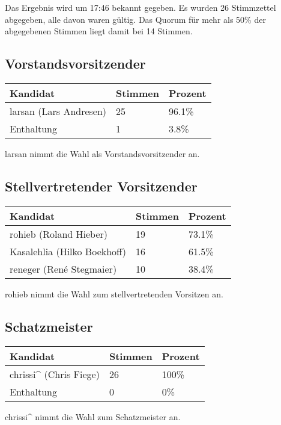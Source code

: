 \documentclass[a4paper,12pt]{scrartcl}
\begin{document}
Das Ergebnis wird um 17:46 bekannt gegeben. Es wurden 26 Stimmzettel abgegeben,
alle davon waren gültig. Das Quorum für mehr als 50\% der abgegebenen Stimmen
liegt damit bei 14 Stimmen.

\subsection*{Vorstandsvorsitzender}
\begin{tabular}{|l|l|l|}
  \hline
  \textbf{Kandidat} & \textbf{Stimmen} & \textbf{Prozent} \\ \hline
  larsan (Lars Andresen) & 25 & 96.1\% \\
  Enthaltung             &  1 &  3.8\% \\
  \hline
\end{tabular}

larsan nimmt die Wahl als Vorstandsvorsitzender an.

\subsection*{Stellvertretender Vorsitzender}
\begin{tabular}{|l|l|l|}
  \hline
  \textbf{Kandidat} & \textbf{Stimmen} & \textbf{Prozent} \\ \hline
  rohieb     (Roland Hieber)  & 19 & 73.1\% \\
  Kasalehlia (Hilko Boekhoff) & 16 & 61.5\% \\
  reneger    (René Stegmaier) & 10 & 38.4\% \\
  \hline
\end{tabular}

rohieb nimmt die Wahl zum stellvertretenden Vorsitzen an.

\subsection*{Schatzmeister}
\begin{tabular}{|l|l|l|}
  \hline
  \textbf{Kandidat} & \textbf{Stimmen} & \textbf{Prozent} \\ \hline
  chrissi\textasciicircum{} (Chris Fiege) & 26 & 100\% \\
  Enthaltung & 0 & 0\% \\
  \hline
\end{tabular}

chrissi\textasciicircum{} nimmt die Wahl zum Schatzmeister an.
\end{document}

